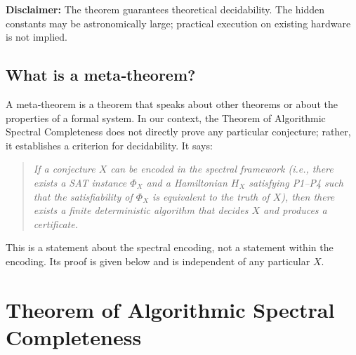 \documentclass[11pt,a4paper]{article}
\begin{document}
\begin{mdframed}[backgroundcolor=gray!10, linecolor=black]
\noindent\textbf{Disclaimer:} The theorem guarantees theoretical decidability. The hidden constants may be astronomically large; practical execution on existing hardware is not implied.
\end{mdframed}

\subsection{What is a meta‑theorem?}

A meta‑theorem is a theorem that speaks about other theorems or about the properties of a formal system. In our context, the Theorem of Algorithmic Spectral Completeness does not directly prove any particular conjecture; rather, it establishes a criterion for decidability. It says:

\begin{quote}
\emph{If a conjecture \(X\) can be encoded in the spectral framework (i.e., there exists a SAT instance \(\Phi_{X}\) and a Hamiltonian \(H_{X}\) satisfying P1–P4 such that the satisfiability of \(\Phi_{X}\) is equivalent to the truth of \(X\)), then there exists a finite deterministic algorithm that decides \(X\) and produces a certificate.}
\end{quote}

This is a statement about the spectral encoding, not a statement within the encoding. Its proof is given below and is independent of any particular \(X\).

\section{Theorem of Algorithmic Spectral Completeness}
\end{document}
